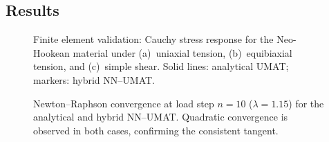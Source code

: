 \subsection{Results}
\label{sec:fe_validation:results}

\begin{figure}[htbp]
\centering
\caption{Finite element validation: Cauchy stress response for the
  Neo-Hookean material under (a)~uniaxial tension, (b)~equibiaxial tension,
  and (c)~simple shear.  Solid lines: analytical UMAT; markers: hybrid
  NN--UMAT.}
\label{fig:fe_validation_stress}
\end{figure}

\begin{figure}[htbp]
\centering
\caption{Newton--Raphson convergence at load step $n=10$ ($\lambda=1.15$)
  for the analytical and hybrid NN--UMAT.  Quadratic convergence is observed
  in both cases, confirming the consistent tangent.}
\label{fig:fe_newton_convergence}
\end{figure}

